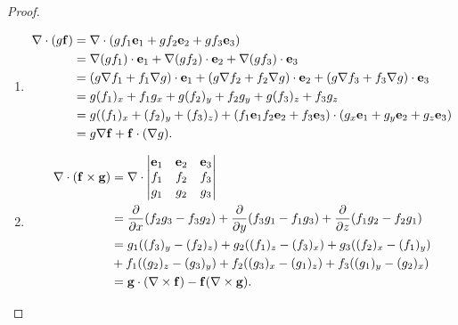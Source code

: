 \documentclass[10pt, a4paper]{article}
\begin{document}
\begin{proposition}
\begin{proof}
\begin{enumerate}[label = (\arabic*)]
            \item 
            \begin{align*}
                \mathbf{\nabla} \cdot (g\mathbf{f}) &= \mathbf{\nabla}\cdot(gf_1\mathbf{e}_1 + gf_2\mathbf{e}_2 + gf_3\mathbf{e}_3) \\
                &= \mathbf{\nabla} (gf_1)\cdot\mathbf{e}_1 + \mathbf{\nabla}(gf_2)\cdot\mathbf{e}_2 + \mathbf{\nabla}(gf_3)\cdot \mathbf{e}_3 \\
                &= (g\mathbf{\nabla} f_1+ f_1\mathbf{\nabla} g) \cdot \mathbf{e}_1 + (g\mathbf{\nabla} f_2 + f_2\mathbf{\nabla} g) \cdot \mathbf{e}_2 + (g\mathbf{\nabla} f_3 + f_3\mathbf{\nabla} g)\cdot \mathbf{e}_3 \\
                &= g(f_1)_x + f_1g_x + g(f_2)_y + f_2g_y + g(f_3)_z + f_3g_z \\
                &= g((f_1)_x + (f_2)_y + (f_3)_z) + (f_1\mathbf{e}_1 f_2\mathbf{e}_2 + f_3\mathbf{e}_3) \cdot(g_x\mathbf{e}_1 + g_y\mathbf{e}_2 + g_z\mathbf{e}_3) \\
                &= g\mathbf{\nabla}\mathbf{f} + \mathbf{f}\cdot(\mathbf{\nabla} g).
            \end{align*}

            \item
            \begin{align*}
                \mathbf{\nabla}\cdot(\mathbf{f} \times \mathbf{g}) &= \mathbf{\nabla} \cdot \begin{vmatrix}
                    \mathbf{e}_1 & \mathbf{e}_2 & \mathbf{e}_3 \\ f_1 & f_2 & f_3 \\ g_1 & g_2 & g_3
                \end{vmatrix} \\
                &= \frac{\partial }{\partial x}(f_2g_3 - f_3g_2) + \frac{\partial }{\partial y}(f_3g_1 - f_1g_3) + \frac{\partial }{\partial z}(f_1g_2 - f_2g_1) \\
                &= g_1((f_3)_y - (f_2)_z) + g_2((f_1)_z - (f_3)_x) + g_3((f_2)_x - (f_1)_y) \\
                &+ f_1((g_2)_z - (g_3)_y) + f_2((g_3)_x - (g_1)_z) + f_3((g_1)_y - (g_2)_x) \\
                &= \mathbf{g} \cdot(\mathbf{\nabla} \times \mathbf{f}) - \mathbf{f}(\mathbf{\nabla} \times \mathbf{g}).
            \end{align*}


\end{enumerate}
\end{proof}
\end{proposition}
\end{document}
